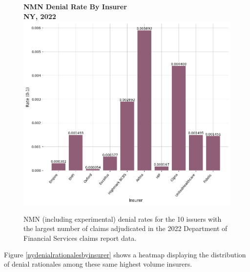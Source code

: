 \documentclass[12pt, a4paper,twoside,parskip=full]{report}
\theoremstyle{plain} %
\theoremstyle{definition} %
\theoremstyle{remark} %
\numberwithin{equation}{chapter}
\begin{document}
		\clearpage
		
		\begin{figure}[h!]
			\centering
			\textbf{NMN Denial Rate By Insurer}\\
			\textbf{NY, 2022}\\
			\includegraphics[width=\columnwidth]{images/ny_claim_reports/nmn_denial_rate_by_insurer.png}
			\caption{NMN (including experimental) denial rates for the 10 issuers with the largest number of claims adjudicated in the 2022 Department of Financial Services claims report data.}
			\label{nyinsurernmndenialrates}
		\end{figure}
	
		
		Figure \ref{nydenialrationalesbyinsurer} shows a heatmap displaying the distribution of denial rationales among these same highest volume insurers.
		
\end{document}
